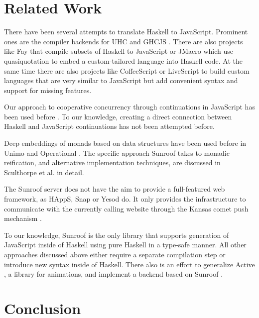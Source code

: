 \documentclass{llncs}
\begin{document}
\section{Related Work}

There have been several attempts to translate Haskell to JavaScript.
Prominent ones are the compiler backends for 
UHC \cite{Stutterheim:12:ImprovingUHCJavaScriptBackend} and 
GHCJS \cite{project:ghcjs}. There are also projects like Fay \cite{project:fay} 
that compile subsets of Haskell to JavaScript or JMacro \cite{project:jmacro}
which use quasiquotation \cite{Mainland:07:QuasiquotingHaskell} to embed 
a custom-tailored language into Haskell code.
%
At the same time there are also projects like 
CoffeeScript \cite{project:coffeescript} or LiveScript \cite{project:livescript}
to build custom languages 
that are very similar to JavaScript but add convenient syntax and
support for missing features.

Our approach to cooperative concurrency through continuations in JavaScript
has been used before 
\cite{Cooper:07:LinksWebProgrammingTiers,Predescu:02:CocoonContinuationBasedControlFlow}.
To our knowledge, creating a direct connection
between Haskell and JavaScript continuations has not been 
attempted before.

Deep embeddings of monads based on data structures have been used before
in Unimo \cite{Lin:06:Unimo} and Operational \cite{Apfelmus:10:Operational,Hackage:10:Operational}.
The specific approach Sunroof takes 
to monadic reification, and alternative implementation techniques,
are discussed in Sculthorpe et al. \cite{Sculthorpe:13:ConstrainedMonads} 
in detail.

The Sunroof server does not have the aim to provide a full-featured 
web framework, as HAppS, Snap or Yesod do. It only provides 
the infrastructure to communicate with the currently calling website
through the Kansas comet \cite{project:kansas-comet} 
push mechanism \cite{pattern:push}. 

To our knowledge, Sunroof is the only library that supports 
generation of JavaScript inside of Haskell using pure Haskell
in a type-safe manner. All other approaches discussed above
either require a separate compilation step or introduce new 
syntax inside of Haskell.
%
There also is an effort to generalize Active \cite{project:active}, a library for animations, and
implement a backend based on Sunroof \cite{project:sunroof-active}.
 
\section{Conclusion}
\end{document}
